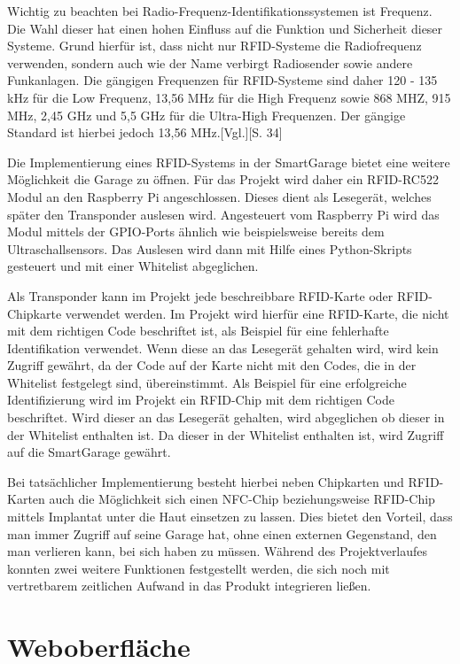 Wichtig zu beachten bei Radio-Frequenz-Identifikationssystemen ist Frequenz. Die Wahl dieser hat einen hohen Einfluss auf die Funktion und Sicherheit dieser Systeme. Grund hierfür ist, dass nicht nur RFID-Systeme die Radiofrequenz verwenden, sondern auch wie der Name verbirgt Radiosender sowie andere Funkanlagen. Die gängigen Frequenzen für RFID-Systeme sind daher 120 - 135 kHz für die Low Frequenz, 13,56 MHz für die High Frequenz sowie 868 MHZ, 915 MHz, 2,45 GHz und 5,5 GHz für die Ultra-High Frequenzen. Der gängige Standard ist hierbei jedoch 13,56 MHz.\autocite{rfid}[Vgl.][S. 34]

Die Implementierung eines RFID-Systems in der SmartGarage bietet eine weitere Möglichkeit die Garage zu öffnen. Für das Projekt wird daher ein RFID-RC522 Modul an den Raspberry Pi angeschlossen. Dieses dient als Lesegerät, welches später den Transponder auslesen wird. Angesteuert vom Raspberry Pi wird das Modul mittels der GPIO-Ports ähnlich wie beispielsweise bereits dem Ultraschallsensors. Das Auslesen wird dann mit Hilfe eines Python-Skripts gesteuert und mit einer Whitelist abgeglichen.

Als Transponder kann im Projekt jede beschreibbare RFID-Karte oder RFID-Chipkarte verwendet werden. Im Projekt wird hierfür eine RFID-Karte, die nicht mit dem richtigen Code beschriftet ist, als Beispiel für eine fehlerhafte Identifikation verwendet. Wenn diese an das Lesegerät gehalten wird, wird kein Zugriff gewährt, da der Code auf der Karte nicht mit den Codes, die in der Whitelist festgelegt sind, übereinstimmt. Als Beispiel für eine erfolgreiche Identifizierung wird im Projekt ein RFID-Chip mit dem richtigen Code beschriftet. Wird dieser an das Lesegerät gehalten, wird abgeglichen ob dieser in der Whitelist enthalten ist. Da dieser in der Whitelist enthalten ist, wird Zugriff auf die SmartGarage gewährt.

Bei tatsächlicher Implementierung besteht hierbei neben Chipkarten und RFID-Karten auch die Möglichkeit sich einen NFC-Chip beziehungsweise RFID-Chip mittels Implantat unter die Haut einsetzen zu lassen. Dies bietet den Vorteil, dass man immer Zugriff auf seine Garage hat, ohne einen externen Gegenstand, den man verlieren kann, bei sich haben zu müssen.
Während des Projektverlaufes konnten zwei weitere Funktionen festgestellt werden, die sich noch mit vertretbarem zeitlichen Aufwand in das Produkt integrieren ließen.

\section{Weboberfläche}


